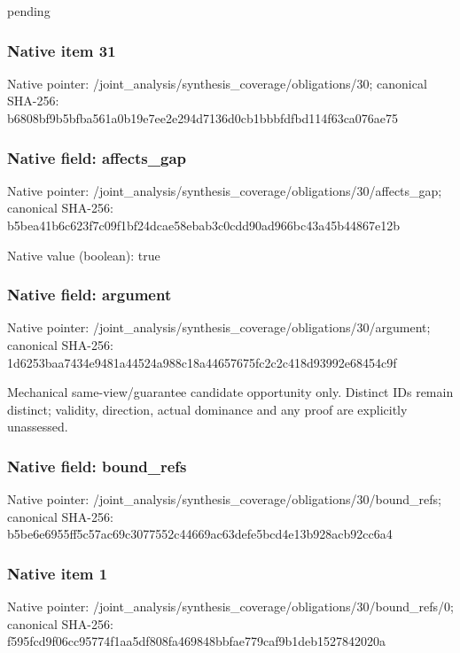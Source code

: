 \documentclass[10pt,a4paper]{article}
\begin{document}
\begingroup\raggedright\sloppy pending\par\endgroup

\subsubsection{Native item 31}
Native pointer: /joint\_\allowbreak{}analysis/synthesis\_\allowbreak{}coverage/obligations/30; canonical SHA-256: b6808bf9b5bfba561a0b19e7ee2e294d7136d0cb1bbbfdfbd114f63ca076ae75

\subsubsection{Native field: affects\_\allowbreak{}gap}
Native pointer: /joint\_\allowbreak{}analysis/synthesis\_\allowbreak{}coverage/obligations/30/affects\_\allowbreak{}gap; canonical SHA-256: b5bea41b6c623f7c09f1bf24dcae58ebab3c0cdd90ad966bc43a45b44867e12b

Native value (boolean): true

\subsubsection{Native field: argument}
Native pointer: /joint\_\allowbreak{}analysis/synthesis\_\allowbreak{}coverage/obligations/30/argument; canonical SHA-256: 1d6253baa7434e9481a44524a988c18a44657675fc2c2c418d93992e68454c9f

\begingroup\raggedright\sloppy Mechanical same-view/\allowbreak{}guarantee candidate opportunity only. Distinct IDs remain distinct;\allowbreak{} validity,\allowbreak{} direction,\allowbreak{} actual dominance and any proof are explicitly unassessed.\par\endgroup

\subsubsection{Native field: bound\_\allowbreak{}refs}
Native pointer: /joint\_\allowbreak{}analysis/synthesis\_\allowbreak{}coverage/obligations/30/bound\_\allowbreak{}refs; canonical SHA-256: b5be6e6955ff5c57ac69c3077552c44669ac63defe5bcd4e13b928acb92cc6a4

\subsubsection{Native item 1}
Native pointer: /joint\_\allowbreak{}analysis/synthesis\_\allowbreak{}coverage/obligations/30/bound\_\allowbreak{}refs/0; canonical SHA-256: f595fcd9f06cc95774f1aa5df808fa469848bbfae779caf9b1deb1527842020a
\end{document}

